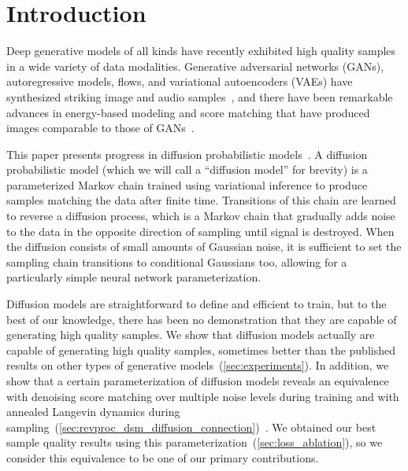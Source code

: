\documentclass{article}
\begin{document}
\section{Introduction}

Deep generative models of all kinds have recently exhibited high quality samples in a wide variety of data modalities. Generative adversarial networks (GANs), autoregressive models, flows, and variational autoencoders (VAEs) have synthesized striking image and audio samples~\citep{goodfellow2014generative,karras2018progressive,brock2018large,oord2016pixel,menick2018generating,kalchbrenner2017video,dinh2016density,kingma2018glow,prenger2019waveglow,oord2016wavenet,kalchbrenner2018efficient,kingma2013auto,razavi2019generating}, and there have been remarkable advances in energy-based modeling and score matching that have produced images comparable to those of GANs~\citep{du2019implicit,song2019generative}.

This paper presents progress in diffusion probabilistic models~\citep{sohl2015deep}. A diffusion probabilistic model (which we will call a ``diffusion model'' for brevity) is a parameterized Markov chain trained using variational inference to produce samples matching the data after finite time. Transitions of this chain are learned to reverse a diffusion process, which is a Markov chain that gradually adds noise to the data in the opposite direction of sampling until signal is destroyed.
When the diffusion consists of small amounts of Gaussian noise, it is sufficient to set the sampling chain transitions to conditional Gaussians too, allowing for a particularly simple neural network parameterization.

Diffusion models are straightforward to define and efficient to train, but to the best of our knowledge, there has been no demonstration that they are capable of generating high quality samples. We show that diffusion models actually are capable of generating high quality samples, sometimes better than the published results on other types of generative models~(\cref{sec:experiments}).
In addition, we show that a certain parameterization of diffusion models reveals an equivalence with denoising score matching over multiple noise levels during training and with annealed Langevin dynamics during sampling~(\cref{sec:revproc_dsm_diffusion_connection})~\citep{song2019generative,vincent2011connection}. 
We obtained our best sample quality results using this parameterization~(\cref{sec:loss_ablation}), so we consider this equivalence to be one of our primary contributions.
\end{document}
